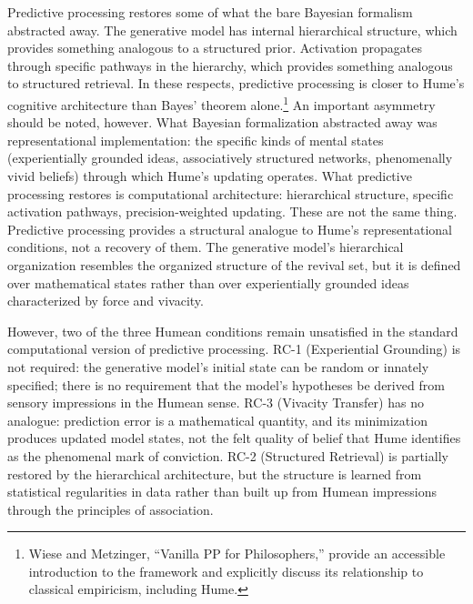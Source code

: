 \documentclass[11pt]{article}
\begin{document}
Predictive processing restores some of what the bare Bayesian formalism abstracted away. The generative model has internal hierarchical structure, which provides something analogous to a structured prior. Activation propagates through specific pathways in the hierarchy, which provides something analogous to structured retrieval. In these respects, predictive processing is closer to Hume's cognitive architecture than Bayes' theorem alone.\footnote{Wiese and Metzinger, ``Vanilla PP for Philosophers,'' provide an accessible introduction to the framework and explicitly discuss its relationship to classical empiricism, including Hume.} An important asymmetry should be noted, however. What Bayesian formalization abstracted away was representational implementation: the specific kinds of mental states (experientially grounded ideas, associatively structured networks, phenomenally vivid beliefs) through which Hume's updating operates. What predictive processing restores is computational architecture: hierarchical structure, specific activation pathways, precision-weighted updating. These are not the same thing. Predictive processing provides a structural analogue to Hume's representational conditions, not a recovery of them. The generative model's hierarchical organization resembles the organized structure of the revival set, but it is defined over mathematical states rather than over experientially grounded ideas characterized by force and vivacity.

However, two of the three Humean conditions remain unsatisfied in the standard computational version of predictive processing. RC-1 (Experiential Grounding) is not required: the generative model's initial state can be random or innately specified; there is no requirement that the model's hypotheses be derived from sensory impressions in the Humean sense. RC-3 (Vivacity Transfer) has no analogue: prediction error is a mathematical quantity, and its minimization produces updated model states, not the felt quality of belief that Hume identifies as the phenomenal mark of conviction. RC-2 (Structured Retrieval) is partially restored by the hierarchical architecture, but the structure is learned from statistical regularities in data rather than built up from Humean impressions through the principles of association.
\end{document}

